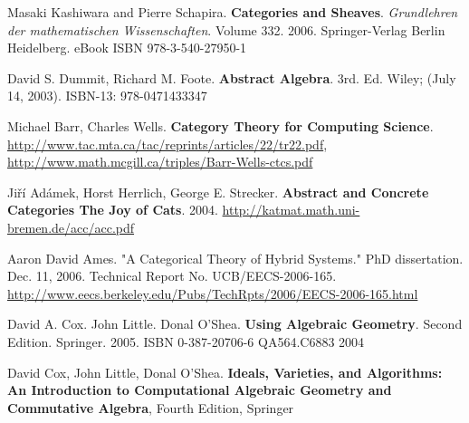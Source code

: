 \documentclass[10pt]{amsart}
\begin{document}
\begin{thebibliography}{9}

Masaki Kashiwara and Pierre Schapira. \textbf{Categories and Sheaves}.  \emph{Grundlehren der mathematischen Wissenschaften}.  Volume 332.  2006. Springer-Verlag Berlin Heidelberg.  eBook ISBN 978-3-540-27950-1


David S. Dummit, Richard M. Foote. \textbf{Abstract Algebra}. 3rd. Ed.  Wiley; (July 14, 2003). ISBN-13: 978-0471433347 

Michael Barr, Charles Wells.  \textbf{Category Theory for Computing Science}.  \url{http://www.tac.mta.ca/tac/reprints/articles/22/tr22.pdf}, \url{http://www.math.mcgill.ca/triples/Barr-Wells-ctcs.pdf}
 
Ji\v{r}\'{i} Ad\'{a}mek, Horst Herrlich, George E. Strecker.   \textbf{Abstract and Concrete Categories The Joy of Cats}. 2004.  \url{http://katmat.math.uni-bremen.de/acc/acc.pdf}

Aaron David Ames. "A Categorical Theory of Hybrid Systems." PhD dissertation. Dec. 11, 2006. Technical Report No. UCB/EECS-2006-165. \url{http://www.eecs.berkeley.edu/Pubs/TechRpts/2006/EECS-2006-165.html}


David A. Cox.  John Little. Donal O'Shea. \textbf{Using Algebraic Geometry}.  Second Edition.  Springer.  2005.  ISBN 0-387-20706-6 QA564.C6883 2004

David Cox, John Little, Donal O'Shea. \textbf{Ideals, Varieties, and Algorithms: An Introduction to Computational Algebraic Geometry and Commutative Algebra}, Fourth Edition, Springer


\end{thebibliography}
\end{document}
